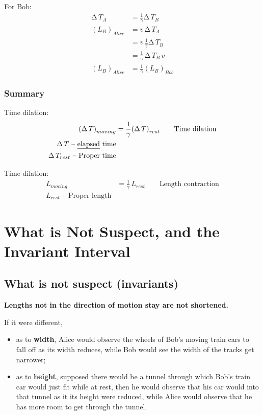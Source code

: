 \documentclass[pagesize,headsepline,10pt,parskip=half]{scrreprt}
\newcommand{\strong}[1]{\textbf{#1}}
\newcommand*\mdelta[1]{\ensuremath{\mathrm{\Delta\,}#1}}
\begin{document}
      For Bob:
      \begin{align*}
        \mdelta{T_A} &= \frac{1}{\gamma} \mdelta{T_B}\\
        {\left(L_B\right)}_{Alice} &= v \, \mdelta{T_A}\\
        &= v\,\frac{1}{\gamma} \mdelta{T_B}\\
        &= \frac{1}{\gamma} \, \mdelta{T_B}\,v\\
        {\left(L_B\right)}_{Alice} &= \frac{1}{\gamma} {\left(L_B\right)}_{Bob}
      \end{align*}

      \subsubsection{Summary}
        Time dilation:
        \begin{align*}
          {\left(\mdelta{T}\right)}_{moving} &= \frac{1}{\gamma} {\left(\mdelta{T}\right)}_{rest} \qquad  \text{Time dilation}\\
          \mdelta{T}\text{ – \underline{elapsed} time}\\
          \mdelta{T}_{rest}\text{ – Proper time}
        \end{align*}

        Time dilation:
        \begin{align*}
          L_{moving} &= \frac{1}{\gamma} \, L_{rest} \qquad \text{Length contraction}\\
          L_{rest}\text{ – Proper length}
        \end{align*}

    \section{What is Not Suspect, and the Invariant Interval}
      \subsection{What is not suspect (invariants)}
        \strong{Lengths not in the direction of motion stay are not shortened.}

        If it were different,
        \begin{itemize}
          \item as to \strong{width}, Alice would observe the wheels of Bob’s
            moving train cars to fall off as its width reduces, while Bob
            would see the width of the tracks get narrower;
          \item as to \strong{height}, supposed there would be a tunnel through
            which Bob’s train car would just fit while at rest, then he would
            observe that his car would into that tunnel as it its height were
            reduced, while Alice would observe that he has more room to get
            through the tunnel.
        \end{itemize}
\end{document}
